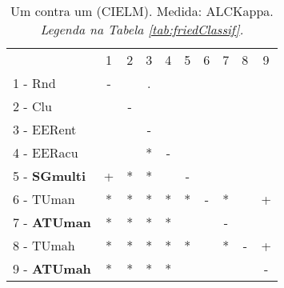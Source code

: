 \begin{table}[h]
\caption{Um contra um (CIELM). Medida: ALCKappa. \textit{Legenda na Tabela \ref{tab:friedClassif}.}}
\begin{center}\begin{tabular}{lcc|cc|cc|cc|c}
 			& 1 & 2 & 3 & 4 & 5 & 6 & 7 & 8 & 9\\
1 - Rnd  	& - &   & . &   &   &   &   &   &   \\
2 - Clu  	&   & - &   &   &   &   &   &   &   \\ \hline
3 - EERent	&   &   & - &   &   &   &   &   &   \\
4 - EERacu	&   &   & * & - &   &   &   &   &   \\ \hline
5 - \textbf{SGmulti}	& + & * & * &   & - &   &   &   &   \\
6 - TUman	& * & * & * & * & * & - & * &   & + \\ \hline
7 - \textbf{ATUman}	& * & * & * & * &   &   & - &   &   \\
8 - TUmah	& * & * & * & * & * &   & * & - & + \\ \hline
9 - \textbf{ATUmah}	& * & * & * & * &   &   &   &   & - \\\end{tabular}
\label{stratsALCKappaFriedCIELMRedux}
\end{center}
\end{table}